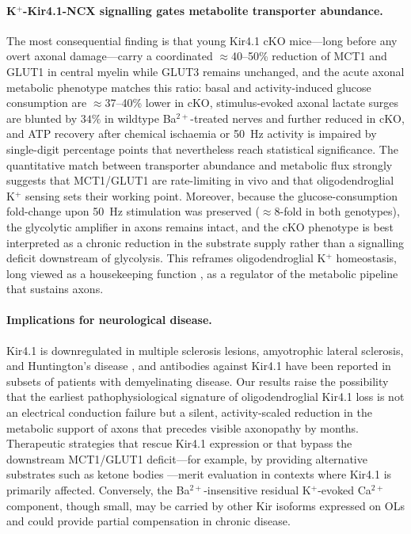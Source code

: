 \documentclass[11pt,a4paper]{article}
\begin{document}
\paragraph{K$^+$-Kir4.1-NCX signalling gates metabolite transporter abundance.} The most consequential finding is that young Kir4.1 cKO mice---long before any overt axonal damage---carry a coordinated $\approx$40--50\% reduction of MCT1 and GLUT1 in central myelin while GLUT3 remains unchanged, and the acute axonal metabolic phenotype matches this ratio: basal and activity-induced glucose consumption are $\approx$37--40\% lower in cKO, stimulus-evoked axonal lactate surges are blunted by $34\%$ in wildtype Ba$^{2+}$-treated nerves and further reduced in cKO, and ATP recovery after chemical ischaemia or 50~Hz activity is impaired by single-digit percentage points that nevertheless reach statistical significance. The quantitative match between transporter abundance and metabolic flux strongly suggests that MCT1/GLUT1 are rate-limiting in vivo and that oligodendroglial K$^+$ sensing sets their working point. Moreover, because the glucose-consumption fold-change upon 50~Hz stimulation was preserved ($\approx$8-fold in both genotypes), the glycolytic amplifier in axons remains intact, and the cKO phenotype is best interpreted as a chronic reduction in the substrate supply rather than a signalling deficit downstream of glycolysis. This reframes oligodendroglial K$^+$ homeostasis, long viewed as a housekeeping function \citep{Olsen2015,Hawkins2017}, as a regulator of the metabolic pipeline that sustains axons.

\paragraph{Implications for neurological disease.} Kir4.1 is downregulated in multiple sclerosis lesions, amyotrophic lateral sclerosis, and Huntington's disease \citep{Tong2014,Schirmer2018,Stumpf2019}, and antibodies against Kir4.1 have been reported in subsets of patients with demyelinating disease. Our results raise the possibility that the earliest pathophysiological signature of oligodendroglial Kir4.1 loss is not an electrical conduction failure but a silent, activity-scaled reduction in the metabolic support of axons that precedes visible axonopathy by months. Therapeutic strategies that rescue Kir4.1 expression or that bypass the downstream MCT1/GLUT1 deficit---for example, by providing alternative substrates such as ketone bodies \citep{Stumpf2019}---merit evaluation in contexts where Kir4.1 is primarily affected. Conversely, the Ba$^{2+}$-insensitive residual K$^+$-evoked Ca$^{2+}$ component, though small, may be carried by other Kir isoforms expressed on OLs \citep{Battefeld2019,Suminaite2019} and could provide partial compensation in chronic disease.
\end{document}
